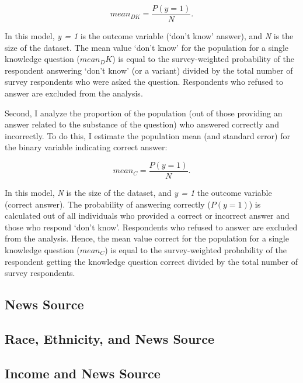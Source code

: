 \documentclass[11pt]{article}
\begin{document}
 $$ mean_{DK} = \frac{P(y = 1)}{N}. $$

In this model, \emph{y = 1} is the outcome variable (`don't know' answer), and
\emph{N} is the size of the dataset. The mean value `don't know' for the population for a single knowledge
question ($mean_DK$) is equal to the survey-weighted probability of the
respondent answering `don't know' (or a variant) divided by the total number of
survey respondents who were asked the question. Respondents who refused to answer are excluded from the analysis.

Second, I analyze the proportion of the population (out of those providing an answer related to the substance of the
question) who answered correctly and incorrectly. To do this, I estimate the
population mean (and standard error) for the binary variable indicating correct
answer:

 $$ mean_C = \frac{P(y = 1)}{N}. $$

In this model, \emph{N} is the size of the dataset, and \emph{y = 1} the outcome
variable (correct answer). The probability of answering correctly ($P(y = 1)$)
is calculated out of all individuals who provided a correct or incorrect answer and those who respond
`don't know'. Respondents who refused to answer are excluded from the analysis.
Hence, the mean value correct for the population for a single knowledge
question ($mean_C$) is equal to the survey-weighted probability of the
respondent getting the knowledge question correct divided by the total number of
survey respondents.










\subsection{News Source}\label{sec:news source}





\subsection{Race, Ethnicity, and News Source}\label{sec:race-news}



\subsection{Income and News Source}\label{sec:income-news}
\end{document}
